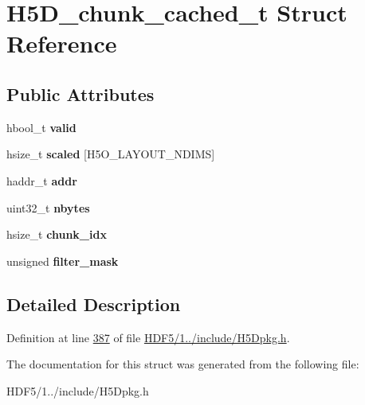 \hypertarget{struct_h5_d__chunk__cached__t}{}\section{H5\+D\+\_\+chunk\+\_\+cached\+\_\+t Struct Reference}
\label{struct_h5_d__chunk__cached__t}
\subsection*{Public Attributes}
\begin{DoxyCompactItemize}
\item 
\mbox{\label{struct_h5_d__chunk__cached__t_a3ba66d0ced0654a214f230b22a9fedfb}} 
hbool\+\_\+t {\bfseries valid}
\item 
\mbox{\label{struct_h5_d__chunk__cached__t_a20f614d1abf0df6403d40665d82584f3}} 
hsize\+\_\+t {\bfseries scaled} \mbox{[}H5\+O\+\_\+\+L\+A\+Y\+O\+U\+T\+\_\+\+N\+D\+I\+MS\mbox{]}
\item 
\mbox{\label{struct_h5_d__chunk__cached__t_af82ad41412ba4d17ba16b370b1039798}} 
haddr\+\_\+t {\bfseries addr}
\item 
\mbox{\label{struct_h5_d__chunk__cached__t_a1d3d3cfa1e53f8bd9412be134c9e53c3}} 
uint32\+\_\+t {\bfseries nbytes}
\item 
\mbox{\label{struct_h5_d__chunk__cached__t_a1e52e0183848d17a30daf5cf8f92a518}} 
hsize\+\_\+t {\bfseries chunk\+\_\+idx}
\item 
\mbox{\label{struct_h5_d__chunk__cached__t_a52eec6f8cc89ee4e229a840e32e30a24}} 
unsigned {\bfseries filter\+\_\+mask}
\end{DoxyCompactItemize}


\subsection{Detailed Description}


Definition at line \hyperlink{_h_d_f5_21_810_81_2include_2_h5_dpkg_8h_source_l00387}{387} of file \hyperlink{_h_d_f5_21_810_81_2include_2_h5_dpkg_8h_source}{H\+D\+F5/1../include/\+H5\+Dpkg.\+h}.



The documentation for this struct was generated from the following file\+:\begin{DoxyCompactItemize}
\item 
H\+D\+F5/1../include/\+H5\+Dpkg.\+h\end{DoxyCompactItemize}
